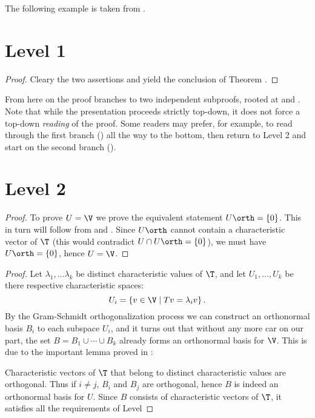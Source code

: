 \documentclass[10pt,oneside]{scrreprt}
\begin{document}
The  following  example is taken from .
\section*{Level 1}
 
\begin{proof} 
Cleary the two assertions  and  
yield the conclusion of Theorem .
\end{proof}
  
\elevator
From here on the proof branches to two independent subproofs, 
rooted at  and . 
Note that while the presentation proceeds strictly top-down, 
it does not force a top-down \emph{reading} of the proof. 
Some readers may prefer, for example, 
to read through the first branch () all the way to the bottom, 
then return to Level 2 and start on the second branch ().


\section*{Level 2}
\begin{proof}
To prove $U=\V$ we prove the equivalent statement $U\orth = \left\{ 0 \right\}$. 
This in turn will follow from  and . 
Since $U\orth$ cannot contain a characteristic vector of $\T$ 
(this would contradict $U \cap U\orth = \left\{ 0 \right\}$), 
we must have $U\orth = \left\{ 0 \right\}$, hence $U=\V$.
\end{proof}
  

\begin{proof}
Let $\lambda_1, \ldots \lambda_k$ be distinct characteristic values of $\T$, 
and let $U_1, \ldots , U_k$ be there respective characteristic spaces:
\[
  U_i = \left\{ v \in \V \;|\; T v = \lambda_i v  \right\}.
\]
By the Gram-Schmidt orthogonalization process 
we can construct an orthonormal basis $B_i$ to each subspace $U_i$, 
and it turns out that without any more car on our part, 
the set $B = B_1 \cup \cdots \cup B_k$ already forms an orthonormal basis for $\V$. 
This is due to the important lemma proved in : 

Characteristic vectors of $\T$ that belong to distinct characteristic values are orthogonal. 
Thus if $i \neq j$, $B_i$ and $B_j$ are orthogonal, 
hence $B$ is indeed an orthonormal basis for $U$. 
Since $B$ consists of characteristic vectors of $\T$, 
it satisfies all the requirements of Level 
\end{proof}
\end{document}
